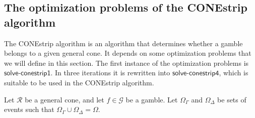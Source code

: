 \documentclass{article}
\theoremstyle{mytheorem}
\newcommand{\func}[1]{\ensuremath{\textsf{#1}}} %
\begin{document}
\subsection{The optimization problems of the CONEstrip algorithm}
The CONEstrip algorithm is an algorithm that determines whether a gamble belongs to a given general cone. It depends on some optimization problems that we will define in this section. The first
instance of the optimization problems is $\func{solve-conestrip1}$. In three iterations it is rewritten into
$\func{solve-conestrip4}$, which is suitable to be used in the CONEstrip algorithm.

\vspace{0.5cm}
\noindent
Let $\mathcal{R}$ be a general cone, and let $f \in \mathcal{G}$ be a gamble.
Let $\Omega_\Gamma$ and $\Omega_\Delta$ be sets of events such that $\Omega_\Gamma \cup \Omega_\Delta = \Omega$.

\end{document}
